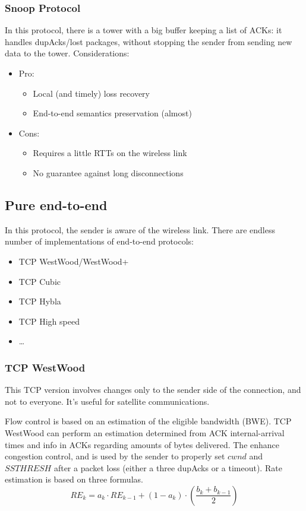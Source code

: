 \subsubsection{Snoop Protocol} In this protocol, there is a tower with a big
buffer keeping a list of ACKs: it handles dupAcks/lost packages, without
stopping the sender from sending new data to the tower.
Considerations:
\begin{itemize}
\item Pro:
  \begin{itemize}
  \item Local (and timely) loss recovery
  \item End-to-end semantics preservation (almost)
  \end{itemize}
\item Cons:
  \begin{itemize}
  \item Requires a little RTTs on the wireless link
  \item No guarantee against long disconnections
  \end{itemize}
\end{itemize}

\subsection{Pure end-to-end} In this protocol, the sender is aware of the wireless
link. There are endless number of implementations of end-to-end protocols:
\begin{itemize}
\item TCP WestWood/WestWood+
\item TCP Cubic
\item TCP Hybla
\item TCP High speed
\item \dots
\end{itemize}

\subsubsection{TCP WestWood} This TCP version involves changes only to the
sender side of the connection, and not to everyone. It's useful for satellite
communications.
 
Flow control is based on an estimation of the eligible bandwidth (BWE). TCP
WestWood can perform an estimation determined from ACK internal-arrival times
and info in ACKs regarding amounts of bytes delivered.
The  enhance congestion control, and is used by the
sender to properly set $cwnd$ and $SSTHRESH$ after a packet loss (either a
three dupAcks or a timeout). Rate estimation is based on three formulas.
\begin{equation}
  RE_k = a_k \cdot RE_{k-1} + (1 - a_k) \cdot \left( \frac{b_k + b_{k-1}}{2}
  \right)
  \label{eq:tcpw:ef}
\end{equation}

